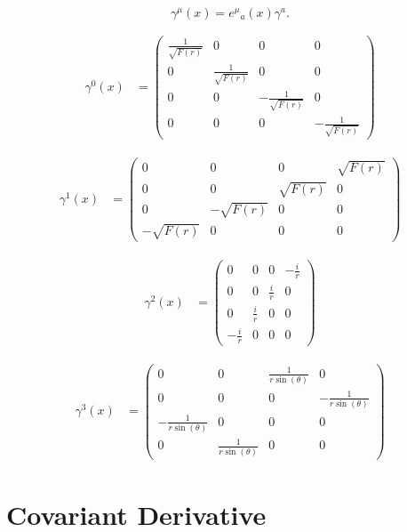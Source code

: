 \documentclass[12pt,fleqn]{article}
\begin{document}
\[
\gamma^\mu(x)
=
e^\mu{}_a(x)
\gamma^a .
\]

\[
\begin{aligned}
\gamma^{0}(x) &=
\begin{pmatrix}
\frac{1}{\sqrt{F{\left(r \right)}}} & 0 & 0 & 0 \\
0 & \frac{1}{\sqrt{F{\left(r \right)}}} & 0 & 0 \\
0 & 0 & - \frac{1}{\sqrt{F{\left(r \right)}}} & 0 \\
0 & 0 & 0 & - \frac{1}{\sqrt{F{\left(r \right)}}}
\end{pmatrix}
\end{aligned}
\]

\[
\begin{aligned}
\gamma^{1}(x) &=
\begin{pmatrix}
0 & 0 & 0 & \sqrt{F{\left(r \right)}} \\
0 & 0 & \sqrt{F{\left(r \right)}} & 0 \\
0 & - \sqrt{F{\left(r \right)}} & 0 & 0 \\
- \sqrt{F{\left(r \right)}} & 0 & 0 & 0
\end{pmatrix}
\end{aligned}
\]

\[
\begin{aligned}
\gamma^{2}(x) &=
\begin{pmatrix}
0 & 0 & 0 & - \frac{i}{r} \\
0 & 0 & \frac{i}{r} & 0 \\
0 & \frac{i}{r} & 0 & 0 \\
- \frac{i}{r} & 0 & 0 & 0
\end{pmatrix}
\end{aligned}
\]

\[
\begin{aligned}
\gamma^{3}(x) &=
\begin{pmatrix}
0 & 0 & \frac{1}{r \sin{\left(\theta \right)}} & 0 \\
0 & 0 & 0 & - \frac{1}{r \sin{\left(\theta \right)}} \\
- \frac{1}{r \sin{\left(\theta \right)}} & 0 & 0 & 0 \\
0 & \frac{1}{r \sin{\left(\theta \right)}} & 0 & 0
\end{pmatrix}
\end{aligned}
\]

\section*{Covariant Derivative}
\end{document}
